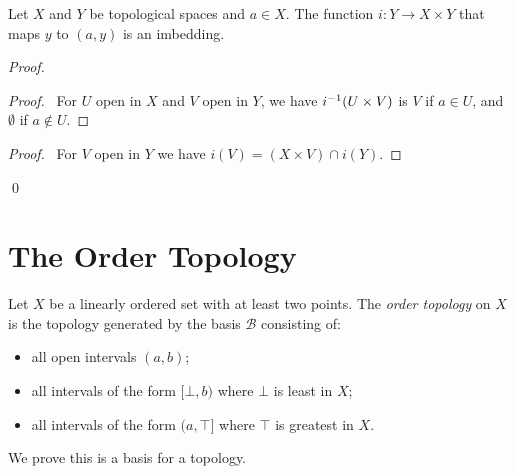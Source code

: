 \begin{proposition}
    \label{proposition:imbedding_product}
    Let $X$ and $Y$ be topological spaces and $a \in X$. The function $i : Y \rightarrow X \times Y$ that maps $y$ to $(a,y)$ is an imbedding.
\end{proposition}

\begin{proof}
    \pf
    \begin{proof}
        \pf\ For $U$ open in $X$ and $V$ open in $Y$, we have ${i}^{-1}(U \times V)$ is $V$ if $a \in U$, and $\emptyset$ if $a \notin U$.
    \end{proof}
    \begin{proof}
        \pf\ For $V$ open in $Y$ we have $i(V) = (X \times V) \cap i(Y)$.
    \end{proof}
    \qed
\end{proof}

\section{The Order Topology}

\begin{definition}
    Let $X$ be a linearly ordered set with at least two points. The \emph{order topology} on $X$ is the topology
    generated by the basis $\mathcal{B}$ consisting of:
    \begin{itemize}
        \item all open intervals $(a,b)$;
        \item all intervals of the form $[\bot,b)$ where $\bot$ is least in $X$;
        \item all intervals of the form $(a,\top]$ where $\top$ is greatest in $X$.
    \end{itemize}
\end{definition}

We prove this is a basis for a topology.

